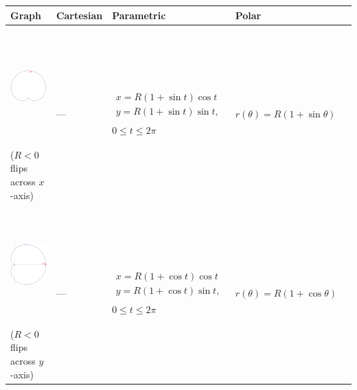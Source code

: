 \documentclass[12pt]{article}
\begin{document}
	\begin{center}
	\begin{tabular}{|C{2.75in}|C{1.625in}|C{1.625in}|C{1.625in}|N}
		\hline
		\textbf{Graph} & 
		\textbf{Cartesian} & 
		\textbf{Parametric} & 
		\textbf{Polar}& \\[5mm]
		

		\hline
		\includegraphics[trim={0 -4.5mm 0 -4.5mm}, clip, height=1.8in]{4_Cardioid} \newline \scriptsize{($R<0$ flips across $x$-axis)} \vspace{3mm} &
		--- & 
		$\begin{array}{c}
		x=R(1+\sin{t})\cos{t}\\
		y=R(1+\sin{t})\sin{t},\\[6mm]
		\end{array}$ $0\leq t\leq 2\pi$ \vspace{-10mm} & 
		$r(\theta)=R(1+\sin{\theta})$ & \\
		
		\hline
		\includegraphics[trim={0 -4.5mm 0 -4.5mm}, clip, height=1.8in]{4_Cardioid2} \newline \scriptsize{($R<0$ flips across $y$-axis)} \vspace{3mm} &
		--- & 
		$\begin{array}{c}
		x=R(1+\cos{t})\cos{t}\\
		y=R(1+\cos{t})\sin{t},\\[6mm]
		\end{array}$ $0\leq t\leq 2\pi$ \vspace{-6mm} & 
		$r(\theta)=R(1+\cos{\theta})$ & \\
		

\end{tabular}
\end{center}
\end{document}
